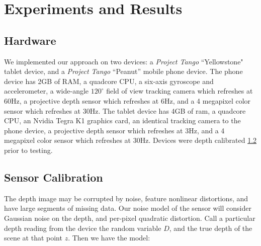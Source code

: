 \documentclass[10pt,twocolumn,letterpaper]{article}
\begin{document}
% 
% 

\section{Experiments and Results}
\subsection{Hardware}
\label{section:hardware}
We implemented our approach on two devices: a \textit{Project Tango}
``Yellowstone" tablet device, and a \textit{Project Tango} ``Peanut'' mobile 
phone device. The phone device has 2GB of RAM, a quadcore
CPU, a six-axis gyroscope and accelerometer, a wide-angle $120^\circ$ field of
view tracking camera which refreshes at 60Hz, a projective depth sensor which
refreshes at 6Hz, and a 4 megapixel color sensor which refreshes at 30Hz. The
tablet device has 4GB of ram, a quadcore CPU, an Nvidia Tegra K1 graphics card,
an identical tracking camera to the phone device, a projective depth sensor
which refreshes at 3Hz, and a 4 megapixel color sensor which refreshes at 30Hz.
Devices were depth calibrated \ref{subsection:calibration} prior to testing. 

 \subsection{Sensor Calibration}
\label{subsection:calibration}
The depth image may be corrupted by noise, feature nonlinear distortions, and
have large segments of missing data. Our noise model of the sensor will consider
Gaussian noise on the depth, and per-pixel quadratic distortion. Call a
particular depth reading from the device the random variable $D$, and the true
depth of the scene at that point $z$. Then we have the model:
 
\end{document}
